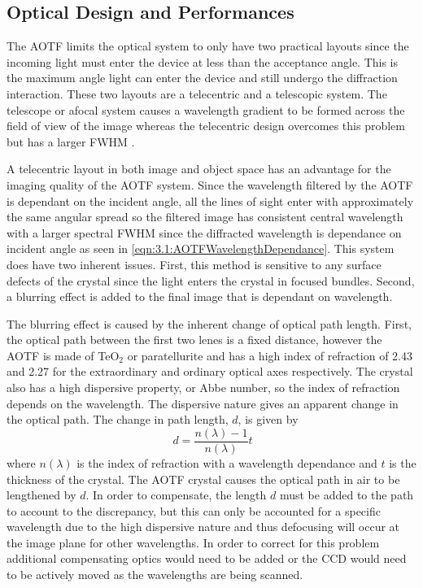 \documentclass[12pt]{article}
\begin{document}
\subsection{Optical Design and Performances}

The AOTF limits the optical system to only have two practical layouts since the incoming light must enter the device at less than the acceptance angle. This is the maximum angle light can enter the device and still undergo the diffraction interaction. These two layouts are a telecentric and a telescopic system. The telescope or afocal system causes a wavelength gradient to be formed across the field of view of the image whereas the telecentric design overcomes this problem but has a larger FWHM \citep{Suhre2004}.

A telecentric layout in both image and object space has an advantage for the imaging quality of the AOTF system. Since the wavelength filtered by the AOTF is dependant on the incident angle, all the lines of sight enter with approximately the same angular spread so the filtered image has consistent central wavelength with a larger spectral FWHM since the diffracted wavelength is dependance on incident angle as seen in \autoref{eqn:3.1:AOTFWavelengthDependance}. This system does have two inherent issues. First, this method is sensitive to any surface defects of the crystal since the light enters the crystal in focused bundles. Second, a blurring effect is added to the final image that is dependant on wavelength.

The blurring effect is caused by the inherent change of optical path length. First, the optical path between the first two lenes is a fixed distance, however the AOTF is made of TeO$_{2}$  or paratellurite and has a high index of refraction of 2.43 and 2.27 for the extraordinary and ordinary optical axes respectively. The crystal also has a high dispersive property, or Abbe number, so the index of refraction depends on the wavelength. The dispersive nature gives an apparent change in the optical path. The change in path length, $d$, is given by
\begin{equation}
    \ d = \frac{n(\lambda)-1}{n(\lambda)}t
    \label{eqn:3.2:opticalPathDisplacement}
\end{equation}
where $n(\lambda)$ is the index of refraction with a wavelength dependance and $t$ is the thickness of the crystal. The AOTF crystal causes the optical path in air to be lengthened by $d$. In order to compensate, the length $d$ must be added to the path to account to the discrepancy, but this can only be accounted for a specific wavelength due to the high dispersive nature and thus defocusing will occur at the image plane for other wavelengths. In order to correct for this problem additional compensating optics would need to be added or the CCD would need to be actively moved as the wavelengths are being scanned.
\end{document}
